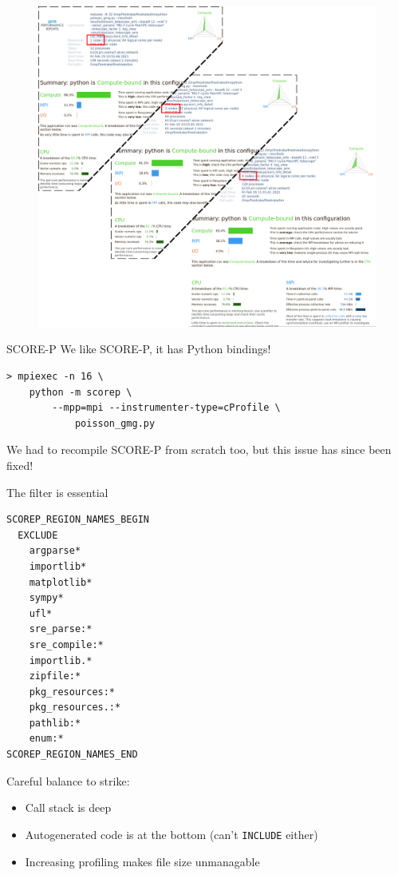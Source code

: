 \documentclass[pdf,aspectratio=169]{beamer}
\begin{document}
\begin{frame}
\begin{figure}
	\includegraphics[width=\textheight]{ddt_all.png}
\end{figure}
\end{frame}

\begin{frame}[fragile]{SCORE-P}
We like SCORE-P, it has Python bindings!
\begin{lstlisting}
> mpiexec -n 16 \
    python -m scorep \
        --mpp=mpi --instrumenter-type=cProfile \
            poisson_gmg.py
\end{lstlisting}
We had to recompile SCORE-P from scratch too, but this issue has since been fixed!


\end{frame}

\begin{frame}[fragile]
The filter is essential
\begin{lstlisting}
SCOREP_REGION_NAMES_BEGIN
  EXCLUDE
    argparse*
    importlib*
    matplotlib*
    sympy*
    ufl*
    sre_parse:*
    sre_compile:*
    importlib.*
    zipfile:*
    pkg_resources:*
    pkg_resources.:*
    pathlib:*
    enum:*
SCOREP_REGION_NAMES_END
\end{lstlisting}

Careful balance to strike:
\begin{itemize}
	\item Call stack is deep
	\item Autogenerated code is at the bottom (can't \verb`INCLUDE` either)
	\item Increasing profiling makes file size unmanagable
\end{itemize}
\end{frame}
\end{document}
